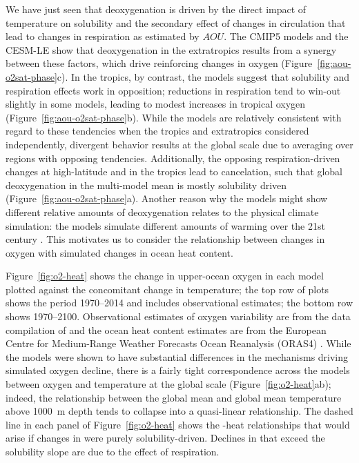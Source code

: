 \documentclass[draft,linenumbers]{report_chapter}
\begin{document}
We have just seen that deoxygenation is driven by the direct impact of temperature on solubility and the secondary effect of changes in circulation that lead to changes in respiration as estimated by $AOU$.
The CMIP5 models and the CESM-LE show that deoxygenation in the extratropics results from a synergy between these factors, which drive reinforcing changes in oxygen (Figure~\ref{fig:aou-o2sat-phase}c).
In the tropics, by contrast, the models suggest that solubility and respiration effects work in opposition; reductions in respiration tend to win-out slightly in some models, leading to modest increases in tropical oxygen (Figure~\ref{fig:aou-o2sat-phase}b).
While the models are relatively consistent with regard to these tendencies when the tropics and extratropics considered independently, divergent behavior results at the global scale due to averaging over regions with opposing tendencies.
Additionally, the opposing respiration-driven changes at high-latitude and in the tropics lead to cancelation, such that global deoxygenation in the multi-model mean is mostly solubility driven (Figure~\ref{fig:aou-o2sat-phase}a).
Another reason why the models might show different relative amounts of deoxygenation relates to the physical climate simulation: the models simulate different amounts of warming over the 21st century \citep{Bopp-Resplandy-etal-2013}.
This motivates us to consider the relationship between changes in oxygen with simulated changes in ocean heat content.

Figure~\ref{fig:o2-heat} shows the change in upper-ocean oxygen in each model plotted against the concomitant change in temperature; the top row of plots shows the period 1970--2014 and includes observational estimates; the bottom row shows 1970--2100.
Observational estimates of oxygen variability are from the data compilation of \citet{Ito-Minobe-etal-2017} and the ocean heat content estimates are from the European Centre for Medium-Range Weather Forecasts Ocean Reanalysis (ORAS4) \citep{Balmaseda-Trenberth-etal-2013}.
While the models were shown to have substantial differences in the mechanisms driving simulated oxygen decline, there is a fairly tight correspondence across the models between oxygen and temperature at the global scale (Figure~\ref{fig:o2-heat}ab); indeed, the relationship between the global mean  and global mean temperature above 1000~m depth tends to collapse into a quasi-linear relationship.
The dashed line in each panel of Figure~\ref{fig:o2-heat} shows the -heat relationships that would arise if changes in  were purely solubility-driven.
Declines in  that exceed the solubility slope are due to the effect of respiration.
\end{document}
